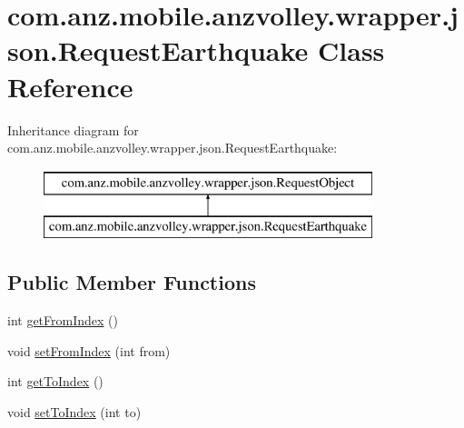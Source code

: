 \hypertarget{classcom_1_1anz_1_1mobile_1_1anzvolley_1_1wrapper_1_1json_1_1_request_earthquake}{\section{com.\+anz.\+mobile.\+anzvolley.\+wrapper.\+json.\+Request\+Earthquake Class Reference}
\label{classcom_1_1anz_1_1mobile_1_1anzvolley_1_1wrapper_1_1json_1_1_request_earthquake}
}
Inheritance diagram for com.\+anz.\+mobile.\+anzvolley.\+wrapper.\+json.\+Request\+Earthquake\+:\begin{figure}[H]
\begin{center}
\leavevmode
\includegraphics[height=2.000000cm]{classcom_1_1anz_1_1mobile_1_1anzvolley_1_1wrapper_1_1json_1_1_request_earthquake}
\end{center}
\end{figure}
\subsection*{Public Member Functions}
\begin{DoxyCompactItemize}
\item 
int \hyperlink{classcom_1_1anz_1_1mobile_1_1anzvolley_1_1wrapper_1_1json_1_1_request_earthquake_ae21b7cf41cb7949b75ae4c56ea3115d8}{get\+From\+Index} ()
\item 
void \hyperlink{classcom_1_1anz_1_1mobile_1_1anzvolley_1_1wrapper_1_1json_1_1_request_earthquake_ab7727ac7211a21369e4327750a867e9a}{set\+From\+Index} (int from)
\item 
int \hyperlink{classcom_1_1anz_1_1mobile_1_1anzvolley_1_1wrapper_1_1json_1_1_request_earthquake_a8e98ba55a4822377853549ac18fcf820}{get\+To\+Index} ()
\item 
void \hyperlink{classcom_1_1anz_1_1mobile_1_1anzvolley_1_1wrapper_1_1json_1_1_request_earthquake_acc497e145d7d3e491f20d6950941b282}{set\+To\+Index} (int to)
\end{DoxyCompactItemize}


